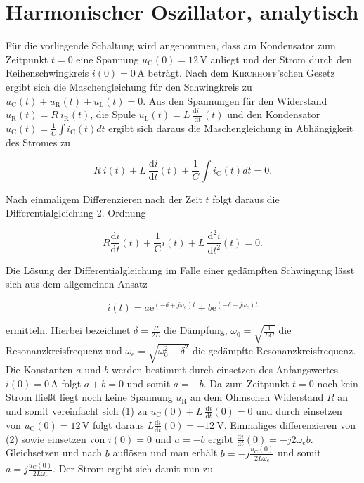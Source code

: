 \documentclass{article}
\begin{document}
	
	\section{Harmonischer Oszillator, analytisch}
	Für die vorliegende Schaltung wird angenommen, dass am Kondensator zum Zeitpunkt $t = 0$ eine Spannung $u_\mathrm{C}(0) = 12\,$V anliegt und der Strom durch den Reihenschwingkreis $i(0) = 0\,$A beträgt. Nach dem \textsc{Kirchhoff}'schen Gesetz ergibt sich die Maschengleichung für den Schwingkreis zu $u_\mathrm{C}(t) + u_\mathrm{R}(t) + u_\mathrm{L}(t) = 0$. Aus den Spannungen für den Widerstand $u_\mathrm{R}(t) = R \: i_\mathrm{R}(t)$, die Spule $u_\mathrm{L}(t) = L\: \frac{\mathrm{d}i_\mathrm{L}}{\mathrm{d}t}(t)$ und den Kondensator $u_\mathrm{C}(t) = \frac{1}{C} \int i_\mathrm{C}(t)dt $ ergibt sich daraus die Maschengleichung in Abhängigkeit des Stromes zu 
	
	\begin{equation*}
		R\:i(t) + L\: \frac{\mathrm{d}i}{\mathrm{d}t}(t) + \frac{1}{C} \int i_\mathrm{C}(t)dt = 0.
	\end{equation*}
	
	Nach einmaligem Differenzieren nach der Zeit $t$ folgt daraus die Differentialgleichung 2. Ordnung 
	
	\begin{equation}
		R  \frac{\mathrm{d}i}{\mathrm{d}t}(t) + \frac{1}{\mathrm{C}} i(t) +  L\: \frac{\mathrm{d^2}i}{\mathrm{d}t^2}(t) = 0.
	\end{equation}
	
	
	
	Die Lösung der Differentialgleichung im Falle einer gedämpften Schwingung lässt sich aus dem allgemeinen Ansatz 
	
	\begin{equation}
			i(t) = a\mathrm{e}^{(-\delta +j\omega_e)t} + b\mathrm{e}^{(-\delta - j\omega_e)t}
	\end{equation}
	
	ermitteln. Hierbei bezeichnet $\delta = \frac{R}{2L}$ die Dämpfung, $\omega_0 = \sqrt{\frac{1}{LC}}$ die Resonanzkreisfrequenz und $\omega_e = \sqrt{\omega_0^2 - \delta^2}$ die gedämpfte Resonanzkreisfrequenz. Die Konstanten $a$ und $b$ werden bestimmt durch einsetzen des Anfangswertes  $i(0) = 0\,$A folgt $a + b = 0$ und somit $a = -b$.\newline
	Da zum Zeitpunkt $t = 0$ noch kein Strom fließt liegt noch keine Spannung $u_\mathrm{R}$ an dem Ohmschen Widerstand $R$ an und somit vereinfacht sich (1) zu $u_\mathrm{C}(0) +  L\: \frac{\mathrm{d}i}{\mathrm{d}t}(0) = 0$ und durch einsetzen von $u_\mathrm{C}(0) = 12\,$V folgt daraus $L\frac{\mathrm{d}i}{\mathrm{d}t}(0) = -12\:$V. Einmaliges differenzieren von (2) sowie einsetzen von $ i(0) = 0$ und $a = -b$ ergibt $\frac{\mathrm{d}i}{\mathrm{d}t}(0) = -j2\omega_e b$. Gleichsetzen und nach $b$ auflösen und man erhält $b = -j \frac{u_\mathrm{C}(0)}{2L\omega_e}$ und somit $a = j\frac{u_\mathrm{C}(0)}{2L\omega_e}$. Der Strom ergibt sich damit nun zu 
	
\end{document}
